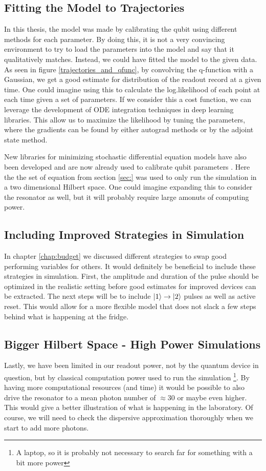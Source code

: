 \subsection{Fitting the Model to Trajectories}
In this thesis, the model was made by calibrating the qubit using different methods for each parameter. By doing this, it is not a very convincing environment to try to load the parameters into the model and say that it qualitatively matches. Instead, we could have fitted the model to the given data. As seen in figure \ref{trajectories_and_qfunc}, by convolving the q-function with a Gaussian, we get a good estimate for distribution of the readout record at a given time. One could imagine using this to calculate the log.likelihood of each point at each time given a set of parameters. If we consider this a cost function, we can leverage the development of ODE integration techniques in deep learning libraries. This allow us to maximize the likelihood by tuning the parameters, where the gradients can be found by either autograd methods or by the adjoint state method. \cite{asdfasdfasedf}

New libraries for minimizing stochastic differential equation models have also been developed and are now already used to calibrate qubit parameters \cite{asadfasdfasdf}. Here the the set of equation from section \ref{sec:} was used to only run the simulation in a two dimensional Hilbert space. One could imagine expanding this to consider the resonator as well, but it will probably require large amonuts of computing power.


\subsection{Including Improved Strategies in Simulation} 
In chapter \ref{chap:budget} we discussed different strategies to swap good performing variables for others. It would definitely be beneficial to include these strategies in simulation. First, the amplitude and duration of the pulse should be optimized in the realistic setting before good estimates for improved devices can be extracted. The next steps will be to include $\ket{1}\to\ket{2}$ pulses as well as active reset. This would allow for a more flexible model that does not slack a few steps behind what is happening at the fridge. 

\subsection{Bigger Hilbert Space - High Power Simulations}
Lastly, we have been limited in our readout power, not by the quantum device in question, but by classical computation power used to run the simulation \footnote{A laptop, so it is probably not necessary to search far for something with a bit more power}. By having more computational resources (and time) it would be possible to also drive the resonator to a mean photon number of $\approx30$ or maybe even higher. This would give a better illustration of what is happening in the laboratory. Of course, we will need to check the dispersive approximation thoroughly when we start to add more photons.   